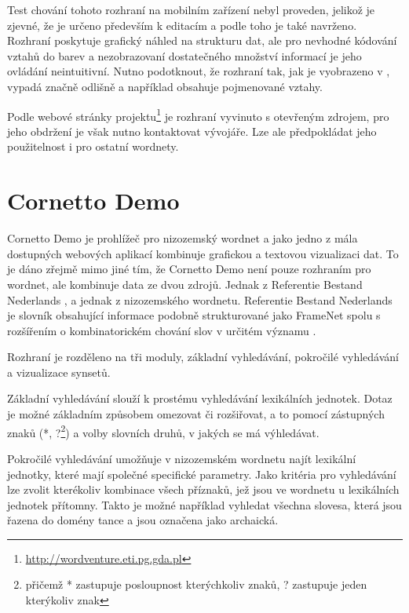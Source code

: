 \documentclass[a4paper, 11pt, oneside]{book}
\newcommand\ex{\textsf}
\begin{document}
				Test chování tohoto rozhraní na mobilním zařízení nebyl proveden, jelikož je zjevné, že je určeno především k editacím a podle toho je také navrženo. Rozhraní poskytuje grafický náhled na strukturu dat, ale pro nevhodné kódování vztahů do barev a nezobrazovaní dostatečného množství informací je jeho ovládání neintuitivní. Nutno podotknout, že rozhraní tak, jak je vyobrazeno v \textcite{szymanski2007cooperative}, vypadá značně odlišně a například obsahuje pojmenované vztahy.

				Podle webové stránky projektu\footnote{\url{http://wordventure.eti.pg.gda.pl}} je rozhraní vyvinuto s otevřeným zdrojem, pro jeho obdržení je však nutno kontaktovat vývojáře. Lze ale předpokládat jeho použitelnost i pro ostatní wordnety.

			\section{Cornetto Demo}
			\label{wnvis:cornetto}

				Cornetto Demo je prohlížeč pro nizozemský wordnet a jako jedno z mála dostupných webových aplikací kombinuje grafickou a textovou vizualizaci dat. To je dáno zřejmě mimo jiné tím, že Cornetto Demo není pouze rozhraním pro wordnet, ale kombinuje data ze dvou zdrojů. Jednak z Referentie Bestand Nederlands \parencite{martin2005referentie}, a jednak z nizozemského wordnetu. Referentie Bestand Nederlands je slovník obsahující informace podobně strukturované jako FrameNet \parencite{fillmore2004framenet} spolu s rozšířením o kombinatorickém chování slov v určitém významu \parencite{horak2008development}. 

				Rozhraní je rozděleno na tři moduly, základní vyhledávání, pokročilé vyhledávání a vizualizace synsetů. 

				Základní vyhledávání slouží k prostému vyhledávání lexikálních jednotek. Dotaz je možné základním způsobem omezovat či rozšiřovat, a to pomocí zástupných znaků (\ex{*}, \ex{?}\footnote{přičemž \ex{*} zastupuje posloupnost kterýchkoliv znaků, \ex{?} zastupuje jeden kterýkoliv znak}) a volby slovních druhů, v jakých se má výhledávat. \parencite{cornettoGettingStarted}

				Pokročilé vyhledávání umožňuje v nizozemském wordnetu najít lexikální jednotky, které mají společné specifické parametry. Jako kritéria pro vyhledávání lze zvolit kterékoliv kombinace všech příznaků, jež jsou ve wordnetu u lexikálních jednotek přítomny. Takto je možné například vyhledat všechna slovesa, která jsou řazena do domény tance a jsou označena jako archaická.  
\end{document}
